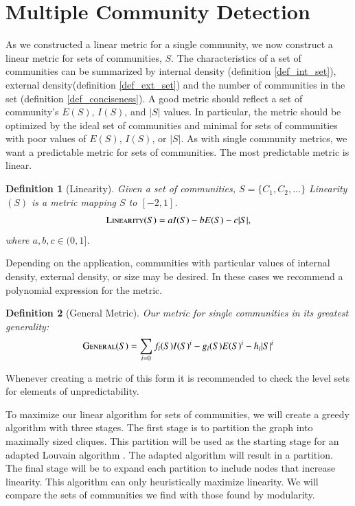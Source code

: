 \documentclass[phd,tocprelim]{cornell}
\newtheorem{definition}{Definition}
\begin{document}
\section{Multiple Community Detection}

As we constructed a linear metric for a single community, we now construct a linear metric for sets of communities, $S$.  The characteristics of a set of communities can be summarized by internal density (definition \ref{def_int_set}), external density(definition \ref{def_ext_set}) and the number of communities in the set (definition \ref{def_conciseness}).  A good metric should reflect a set of community's $E(S)$, $I(S)$, and $|S|$ values.  In particular, the metric should be optimized by the ideal set of communities and minimal for sets of communities with poor values of $E(S)$, $I(S)$, or $|S|$.  As with single community metrics, we want a predictable metric for sets of communities.  The most predictable metric is linear.
\begin{definition}[Linearity] Given a set of communities, $S = \{C_1, C_2, \dots \}$ {\sc Linearity}$(S)$ is a metric mapping $S$ to $[-2, 1]$.
  \begin{equation}
   \mbox{\sc Linearity}(S) = a I(S) - b E(S) - c |S|,
  \end{equation}
where $a,b,c \in (0, 1]$.
\end{definition}
Depending on the application, communities with particular values of internal density, external density, or size may be desired.  In these cases we recommend a polynomial expression for the metric.
\begin{definition}[General Metric]
 Our metric for single communities in its greatest generality:
  \begin{equation}
   \mbox{\sc General} (S) = \sum\limits_{i = 0} f_i(S) I(S)^i - g_i(S) E(S)^i - h_i |S|^i
  \end{equation}
\end{definition}
Whenever creating a metric of this form it is recommended to check the level sets for elements of unpredictability.

To maximize our linear algorithm for sets of communities, we will create a greedy algorithm with three stages.  The first stage is to partition the graph into maximally sized cliques.  This partition will be used as the starting stage for an adapted Louvain algorithm \cite{blondel}.  The adapted algorithm will result in a partition.  The final stage will be to expand each partition to include nodes that increase linearity.  This algorithm can only heuristically maximize linearity.  We will compare the sets of communities we find with those found by modularity.
\end{document}
